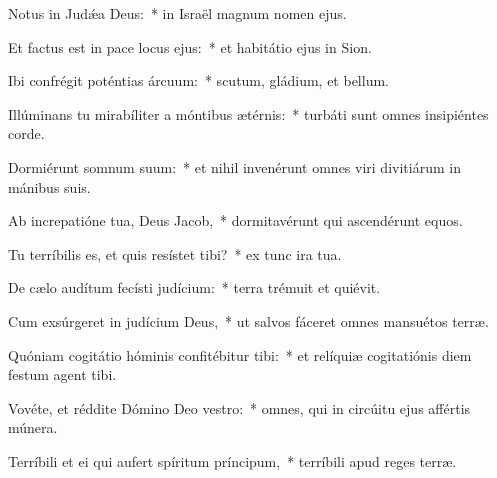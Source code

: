 \item Notus in Judǽa Deus:~* in Israël magnum nomen ejus.

\item Et factus est in pace locus ejus:~* et habitátio ejus in Sion.

\item Ibi confrégit poténtias árcuum:~* scutum, gládium, et bellum.

\item Illúminans tu mirabíliter a móntibus ætérnis:~* turbáti sunt omnes insipiéntes corde.

\item Dormiérunt somnum suum:~* et nihil invenérunt omnes viri divitiárum in mánibus suis.

\item Ab increpatióne tua, Deus Jacob,~* dormitavérunt qui ascendérunt equos.

\item Tu terríbilis es, et quis resístet tibi?~* ex tunc ira tua.

\item De cælo audítum fecísti judícium:~* terra trémuit et quiévit.

\item Cum exsúrgeret in judícium Deus,~* ut salvos fáceret omnes mansuétos terræ.

\item Quóniam cogitátio hóminis confitébitur tibi:~* et relíquiæ cogitatiónis diem festum agent tibi.

\item Vovéte, et réddite Dómino Deo vestro:~* omnes, qui in circúitu ejus affértis múnera.

\item Terríbili et ei qui aufert spíritum príncipum,~* terríbili apud reges terræ.